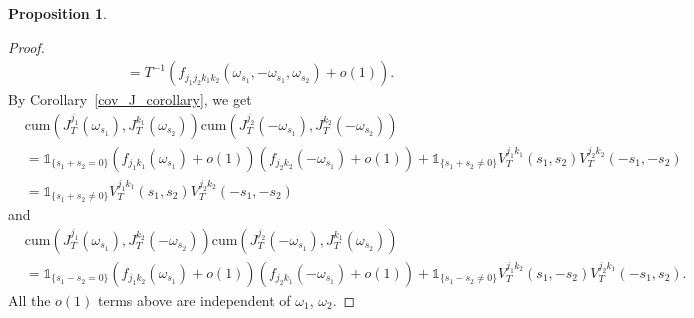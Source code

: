 \documentclass[11pt]{article}
\numberwithin{equation}{section}
\theoremstyle{plain}
\theoremstyle{definition}
\theoremstyle{definition}
\theoremstyle{assumption}
\theoremstyle{proposition}
\newtheorem{proposition}{Proposition}[section]
\theoremstyle{proposition}
\theoremstyle{example}
\theoremstyle{lemma}
\theoremstyle{theorem}
\theoremstyle{remark}
\begin{document}
\begin{proposition}
\begin{proof}
\begin{align*}
=T^{-1}\left(f_{j_1 j_2 k_1 k_2}(\omega_{s_1},-\omega_{s_1},\omega_{s_2}) + o(1)\right).
\end{align*}
By Corollary~\ref{cov_J_corollary}, we get
\begin{align*}
&\mathrm{cum}(J_T^{j_1}(\omega_{s_1}), J_T^{k_1}(\omega_{s_2}))\mathrm{cum}(J_T^{j_2}(-\omega_{s_1}), J_T^{k_2}(-\omega_{s_2})) \\
&=\mathds{1}_{\{s_1+s_2=0\}}(f_{j_1 k_1}(\omega_{s_1}) + o(1))(f_{j_2 k_2}(-\omega_{s_1}) + o(1)) + \mathds{1}_{\{s_1+s_2\neq0\}}V_{T}^{j_1 k_1}(s_1,s_2)V_{T}^{j_2 k_2}(-s_1,-s_2) \\
&= \mathds{1}_{\{s_1+s_2\neq0\}}V_{T}^{j_1 k_1}(s_1,s_2)V_{T}^{j_2 k_2}(-s_1,-s_2)
\end{align*}
and
\begin{align*}
&\mathrm{cum}(J_T^{j_1}(\omega_{s_1}), J_T^{k_2}(-\omega_{s_2}))\mathrm{cum}(J_T^{j_2}(-\omega_{s_1}), J_T^{k_1}(\omega_{s_2})) \\
&=\mathds{1}_{\{s_1-s_2=0\}}(f_{j_1 k_2}(\omega_{s_1}) + o(1))(f_{j_2 k_1}(-\omega_{s_1}) + o(1)) + \mathds{1}_{\{s_1-s_2\neq0\}}V_{T}^{j_1 k_2}(s_1,-s_2)V_{T}^{j_2 k_1}(-s_1,s_2) . 
\end{align*}
All the $o(1)$ terms above are independent of $\omega_1$, $\omega_2$. 
\end{proof}
\end{proposition}
\end{document}
